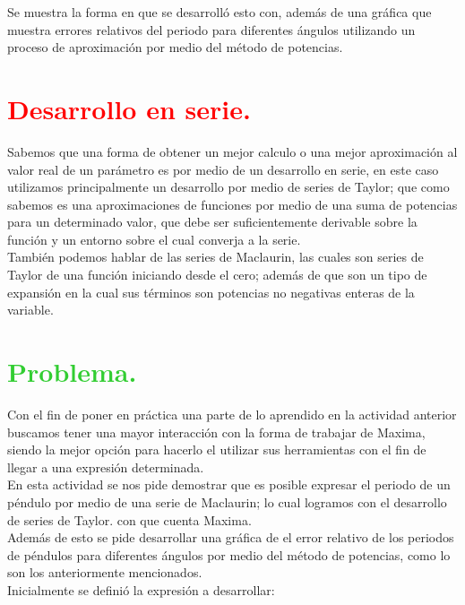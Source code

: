 \documentclass[12pt]{article}
\begin{document}
 Se muestra la forma en que se desarrolló esto con, además de una gráfica que muestra errores relativos del periodo para diferentes ángulos utilizando un proceso de aproximación por medio del método de potencias.
 
 
\section*{\textcolor{Red}{Desarrollo en serie.}}

Sabemos que una forma de obtener un mejor calculo o una mejor aproximación al valor real de un parámetro es por medio de un desarrollo en serie, en este caso utilizamos principalmente un desarrollo por medio de series de Taylor; que como sabemos es una aproximaciones de funciones por medio de una suma de potencias para un determinado valor, que debe ser suficientemente derivable sobre la función y un entorno sobre el cual converja a la serie.\\

También podemos hablar de las series de Maclaurin, las cuales son series de Taylor de una función iniciando desde el cero; además de que son un tipo de expansión en la cual sus términos son potencias no negativas enteras de la variable.

\pagebreak
\section*{\textcolor{LimeGreen}{Problema.}}

Con el fin de poner en práctica una parte de lo aprendido en la actividad anterior buscamos tener una mayor interacción con la forma de trabajar de Maxima, siendo la mejor opción para hacerlo el utilizar sus herramientas con el fin de llegar a una expresión determinada.\\

En esta actividad se nos pide demostrar que es posible expresar el periodo de un péndulo por medio de una serie de Maclaurin; lo cual logramos con el desarrollo de series de Taylor. con que cuenta Maxima.\\

Además de esto se pide desarrollar una gráfica de el error relativo de los periodos de péndulos para diferentes ángulos por medio del método de potencias, como lo son los anteriormente mencionados.\\

Inicialmente se definió la expresión a desarrollar:
\end{document}
